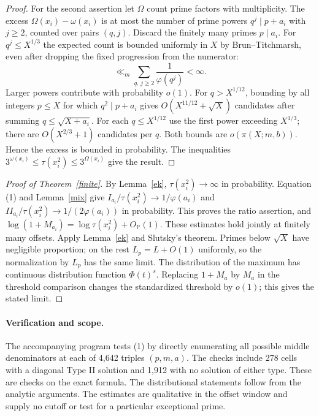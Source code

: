\documentclass[11pt]{article}
\newcommand{\PP}{\mathbb P}
\begin{document}
\begin{proof}
For the second assertion let $\Omega$ count prime factors with multiplicity. The excess $\Omega(x_i)-\omega(x_i)$ is at most the number of prime powers $q^j\mid p+a_i$ with $j\ge2$, counted over pairs $(q,j)$. Discard the finitely many primes $p\mid a_i$. For $q^j\le X^{1/3}$ the expected count is bounded uniformly in $X$ by Brun--Titchmarsh, even after dropping the fixed progression from the numerator:
\[
 \ll_m \sum_{q,\,j\ge2}\frac{1}{\varphi(q^j)}<\infty.
\]
Larger powers contribute with probability $o(1)$. For $q>X^{1/12}$, bounding by all integers $p\le X$ for which $q^2\mid p+a_i$ gives $O(X^{11/12}+\sqrt X)$ candidates after summing $q\le\sqrt{X+a_i}$. For each $q\le X^{1/12}$ use the first power exceeding $X^{1/3}$; there are $O(X^{2/3}+1)$ candidates per $q$. Both bounds are $o(\pi(X;m,b))$. Hence the excess is bounded in probability. The inequalities $3^{\omega(x_i)}\le\tau(x_i^2)\le3^{\Omega(x_i)}$ give the result.
\end{proof}

\begin{proof}[Proof of Theorem~\ref{finite}]
By Lemma~\ref{ek}, $\tau(x_i^2)\to\infty$ in probability. Equation (1) and Lemma~\ref{mix} give $I_{a_i}/\tau(x_i^2)\to1/\varphi(a_i)$ and $II_{a_i}/\tau(x_i^2)\to1/(2\varphi(a_i))$ in probability. This proves the ratio assertion, and $\log(1+M_{a_i})=\log\tau(x_i^2)+O_{\PP}(1)$. These estimates hold jointly at finitely many offsets. Apply Lemma~\ref{ek} and Slutsky's theorem. Primes below $\sqrt X$ have negligible proportion; on the rest $L_p=L+O(1)$ uniformly, so the normalization by $L_p$ has the same limit. The distribution of the maximum has continuous distribution function $\Phi(t)^s$. Replacing $1+M_a$ by $M_a$ in the threshold comparison changes the standardized threshold by $o(1)$; this gives the stated limit.
\end{proof}

\paragraph{Verification and scope.} The accompanying program tests (1) by directly enumerating all possible middle denominators at each of 4,642 triples $(p,m,a)$. The checks include 278 cells with a diagonal Type II solution and 1,912 with no solution of either type. These are checks on the exact formula. The distributional statements follow from the analytic arguments. The estimates are qualitative in the offset window and supply no cutoff or test for a particular exceptional prime.
\end{document}
